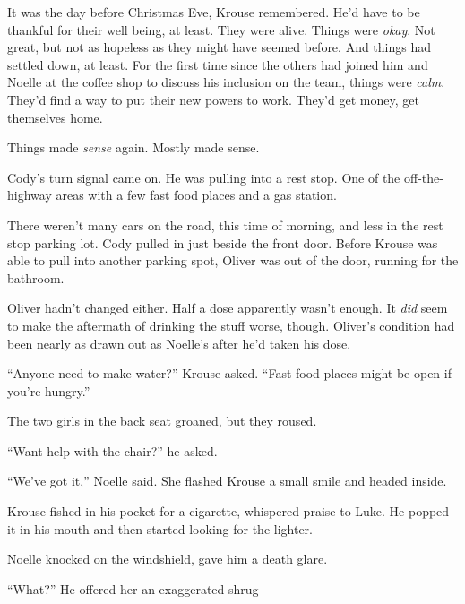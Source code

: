 It was the day before Christmas Eve, Krouse remembered.  He'd have to be thankful for their well being, at least.  They were alive.  Things were \emph{okay}.  Not great, but not as hopeless as they might have seemed before.  And things had settled down, at least.  For the first time since the others had joined him and Noelle at the coffee shop to discuss his inclusion on the team, things were \emph{calm}.  They'd find a way to put their new powers to work.  They'd get money, get themselves home.



Things made \emph{sense} again.  Mostly made sense.



Cody's turn signal came on.  He was pulling into a rest stop.  One of the off-the-highway areas with a few fast food places and a gas station.



There weren't many cars on the road, this time of morning, and less in the rest stop parking lot.  Cody pulled in just beside the front door.  Before Krouse was able to pull into another parking spot, Oliver was out of the door, running for the bathroom.



Oliver hadn't changed either.  Half a dose apparently wasn't enough.  It \emph{did} seem to make the aftermath of drinking the stuff worse, though.  Oliver's condition had been nearly as drawn out as Noelle's after he'd taken his dose.



``Anyone need to make water?'' Krouse asked.  ``Fast food places might be open if you're hungry.''



The two girls in the back seat groaned, but they roused.



``Want help with the chair?'' he asked.



``We've got it,'' Noelle said.  She flashed Krouse a small smile and headed inside.



Krouse fished in his pocket for a cigarette, whispered praise to Luke.  He popped it in his mouth and then started looking for the lighter.



Noelle knocked on the windshield, gave him a death glare.



``What?''  He offered her an exaggerated shrug



